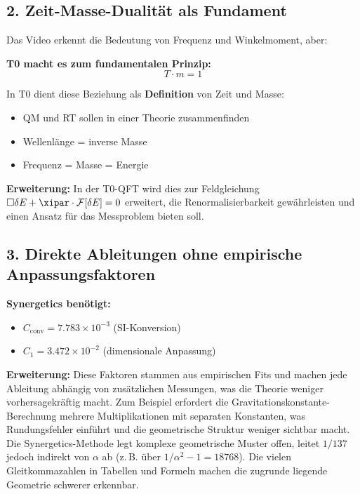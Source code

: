 	\subsection{2. Zeit-Masse-Dualität als Fundament}
	
	Das Video erkennt die Bedeutung von Frequenz und Winkelmoment, aber:
	
	\begin{vorteil}
		\textbf{T0 macht es zum fundamentalen Prinzip:}
		\begin{equation}
			\boxed{T \cdot m = 1}
		\end{equation}
		
		In T0 dient diese Beziehung als \textbf{Definition} von Zeit und Masse:
		\begin{itemize}
			\item QM und RT sollen in einer Theorie zusammenfinden
			\item Wellenlänge = inverse Masse
			\item Frequenz = Masse = Energie
		\end{itemize}
		
		\textbf{Erweiterung:} In der T0-QFT wird dies zur Feldgleichung $\square \delta E + \xipar \cdot \mathcal{F}[\delta E] = 0$ erweitert, die Renormalisierbarkeit gewährleisten und einen Ansatz für das Messproblem bieten soll.
	\end{vorteil}
	
	\subsection{3. Direkte Ableitungen ohne empirische Anpassungsfaktoren}
	
	\textbf{Synergetics benötigt:}
	\begin{itemize}
		\item $C_{\text{conv}} = 7.783 \times 10^{-3}$ (SI-Konversion)
		\item $C_1 = 3.472 \times 10^{-2}$ (dimensionale Anpassung)
	\end{itemize}
	
	\textbf{Erweiterung:} Diese Faktoren stammen aus empirischen Fits und machen jede Ableitung abhängig von zusätzlichen Messungen, was die Theorie weniger vorhersagekräftig macht. Zum Beispiel erfordert die Gravitationskonstante-Berechnung mehrere Multiplikationen mit separaten Konstanten, was Rundungsfehler einführt und die geometrische Struktur weniger sichtbar macht. Die Synergetics-Methode legt komplexe geometrische Muster offen, leitet $1/137$ jedoch indirekt von $\alpha$ ab (z.\,B. über $1/\alpha^2 - 1 = 18768$). Die vielen Gleitkommazahlen in Tabellen und Formeln machen die zugrunde liegende Geometrie schwerer erkennbar.
	
